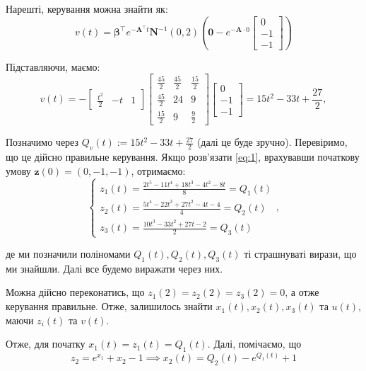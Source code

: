 \documentclass[oneside,solution]{karazin-control-assign}
\begin{document}
Нарешті, керування можна знайти як:
\begin{equation}
    v(t) = \boldsymbol{\beta}^{\top}e^{-\boldsymbol{A}^{\top}t}\boldsymbol{N}^{-1}(0,2)\left(\mathbf{0} - e^{-\boldsymbol{A} \cdot 0}\begin{bmatrix}
        0 \\ -1 \\ -1
    \end{bmatrix}\right)
\end{equation}

Підставляючи, маємо:
\begin{equation}
    v(t) = -\begin{bmatrix}
        \frac{t^2}{2} & -t & 1
    \end{bmatrix}\begin{bmatrix}
        \frac{45}{2} & \frac{45}{2} & \frac{15}{2} \\
        \frac{45}{2} & 24 & 9 \\
        \frac{15}{2} & 9 & \frac{9}{2}
    \end{bmatrix}\begin{bmatrix}
        0 \\ -1 \\ -1
    \end{bmatrix} = 15t^2 - 33t + \frac{27}{2},
\end{equation}

Позначимо через $Q_v(t) := 15t^2-33t+\frac{27}{2}$ (далі це буде зручно). Перевіримо, що це дійсно правильне керування. Якщо розв'язати \ref{eq:1}, врахувавши початкову умову $\mathbf{z}(0)=(0,-1,-1)$, отримаємо:
\begin{equation}
    \begin{cases}
        z_1(t) = \frac{2t^5-11t^4+18t^3-4t^2-8t}{8} = Q_1(t) \\
        z_2(t) = \frac{5t^4 - 22t^3 + 27t^2 - 4t - 4}{4} = Q_2(t) \\
        z_3(t) = \frac{10t^3 - 33t^2 + 27t - 2}{2} = Q_3(t)
    \end{cases},
\end{equation}

де ми позначили поліномами $Q_1(t),Q_2(t),Q_3(t)$ ті страшнуваті вирази, що ми знайшли. Далі все будемо виражати через них. 

Можна дійсно переконатись, що $z_1(2)=z_2(2)=z_3(2)=0$, а отже керування правильне. Отже, залишилось знайти $x_1(t),x_2(t),x_3(t)$ та $u(t)$, маючи $z_i(t)$ та $v(t)$. 

Отже, для початку $x_1(t)=z_1(t) = Q_1(t)$. Далі, помічаємо, що
\begin{equation}
    z_2 = e^{x_1}+x_2-1 \implies x_2(t) = Q_2(t) - e^{Q_1(t)} + 1
\end{equation}
\end{document}
